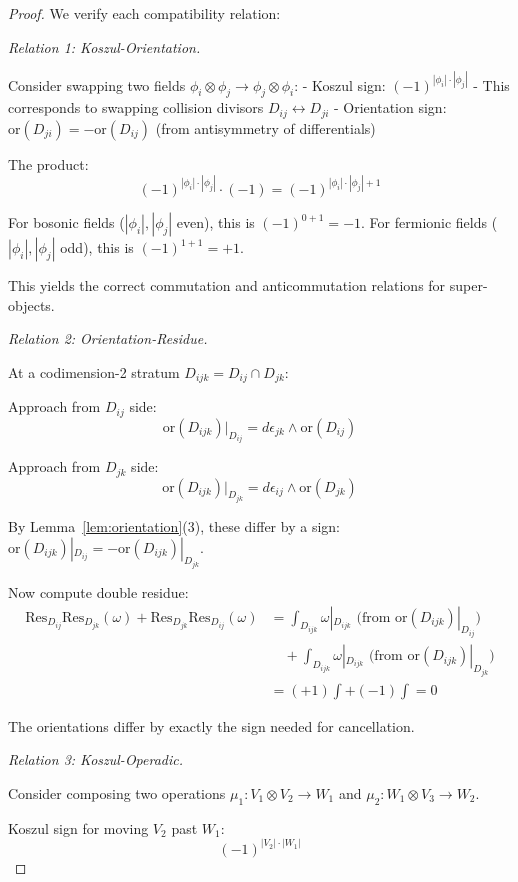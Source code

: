 \begin{proof}
We verify each compatibility relation:

\emph{Relation 1: Koszul-Orientation.}

Consider swapping two fields $\phi_i \otimes \phi_j \to \phi_j \otimes \phi_i$:
- Koszul sign: $(-1)^{|\phi_i| \cdot |\phi_j|}$
- This corresponds to swapping collision divisors $D_{ij} \leftrightarrow D_{ji}$
- Orientation sign: $\text{or}(D_{ji}) = -\text{or}(D_{ij})$ (from antisymmetry of differentials)

The product:
\[(-1)^{|\phi_i| \cdot |\phi_j|} \cdot (-1) = (-1)^{|\phi_i| \cdot |\phi_j| + 1}\]

For bosonic fields ($|\phi_i|, |\phi_j|$ even), this is $(-1)^{0+1} = -1$.
For fermionic fields ($|\phi_i|, |\phi_j|$ odd), this is $(-1)^{1+1} = +1$.

This yields the correct commutation and anticommutation relations for super-objects.

\emph{Relation 2: Orientation-Residue.}

At a codimension-2 stratum $D_{ijk} = D_{ij} \cap D_{jk}$:

Approach from $D_{ij}$ side:
\[\text{or}(D_{ijk})|_{D_{ij}} = d\epsilon_{jk} \wedge \text{or}(D_{ij})\]

Approach from $D_{jk}$ side:
\[\text{or}(D_{ijk})|_{D_{jk}} = d\epsilon_{ij} \wedge \text{or}(D_{jk})\]

By Lemma~\ref{lem:orientation}(3), these differ by a sign: $\text{or}(D_{ijk})|_{D_{ij}} = -\text{or}(D_{ijk})|_{D_{jk}}$.

Now compute double residue:
\begin{align*}
\text{Res}_{D_{ij}} \text{Res}_{D_{jk}}(\omega) + \text{Res}_{D_{jk}} \text{Res}_{D_{ij}}(\omega) &= \int_{D_{ijk}} \omega|_{D_{ijk}} \text{ (from }\text{or}(D_{ijk})|_{D_{ij}}\text{)} \\
&\quad + \int_{D_{ijk}} \omega|_{D_{ijk}} \text{ (from }\text{or}(D_{ijk})|_{D_{jk}}\text{)} \\
&= (+1) \int + (-1) \int = 0
\end{align*}

The orientations differ by exactly the sign needed for cancellation.

\emph{Relation 3: Koszul-Operadic.}

Consider composing two operations $\mu_1: V_1 \otimes V_2 \to W_1$ and $\mu_2: W_1 \otimes V_3 \to W_2$.

Koszul sign for moving $V_2$ past $W_1$:
\[(-1)^{|V_2| \cdot |W_1|}\]


\end{proof}
